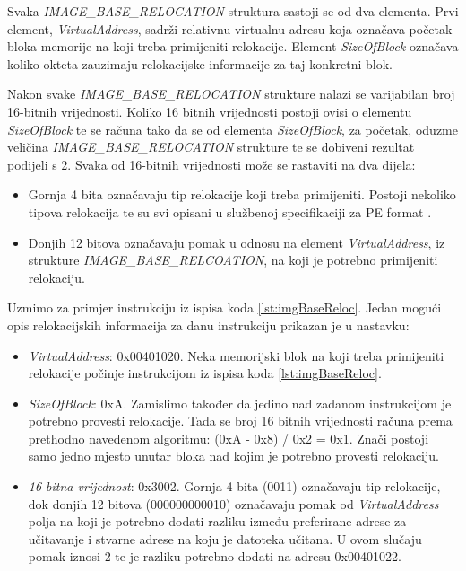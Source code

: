 \documentclass[times, utf8, diplomski, numeric]{fer}
\begin{document}
Svaka \emph{IMAGE\_BASE\_RELOCATION} struktura sastoji se od dva
elementa. Prvi element, \emph{VirtualAddress}, sadrži relativnu
virtualnu adresu koja označava početak bloka memorije na koji
treba primijeniti relokacije. Element \emph{SizeOfBlock} označava
koliko okteta zauzimaju relokacijske informacije za taj konkretni
blok. 

Nakon svake \emph{IMAGE\_BASE\_RELOCATION} strukture nalazi se
varijabilan broj 16-bitnih vrijednosti. Koliko 16 bitnih vrijednosti 
postoji ovisi o elementu \emph{SizeOfBlock} te se računa tako da
se od elementa \emph{SizeOfBlock}, za početak, oduzme veličina \emph{IMAGE\_BASE\_RELOCATION}
strukture te se dobiveni rezultat podijeli s 2. Svaka od 16-bitnih
vrijednosti može se rastaviti na dva dijela:

\begin{itemize}
\item Gornja 4 bita označavaju tip relokacije koji treba
primijeniti. Postoji nekoliko tipova relokacija te su svi opisani
u službenoj specifikaciji za PE format \citep{pe_spec}.

\item Donjih 12 bitova označavaju pomak u odnosu na element
\emph{VirtualAddress}, iz strukture
\emph{IMAGE\_BASE\_RELCOATION}, na koji je potrebno primijeniti
relokaciju.
\end{itemize}
Uzmimo za primjer instrukciju iz ispisa koda \ref{lst:imgBaseReloc}. Jedan mogući
opis relokacijskih informacija za danu instrukciju prikazan je u nastavku:
\begin{itemize}
\item \emph{VirtualAddress}: 0x00401020. Neka memorijski blok na koji treba
primijeniti relokacije počinje instrukcijom iz ispisa koda \ref{lst:imgBaseReloc}.
\item \emph{SizeOfBlock}: 0xA. Zamislimo također da jedino nad zadanom instrukcijom
je potrebno provesti relokacije. Tada se broj 16 bitnih vrijednosti računa prema 
prethodno navedenom algoritmu: (0xA - 0x8) / 0x2 = 0x1. Znači postoji samo jedno mjesto 
unutar bloka nad kojim je potrebno provesti relokaciju.
\item \emph{16 bitna vrijednost}: 0x3002. Gornja 4 bita (0011) označavaju tip relokacije,
dok donjih 12 bitova (000000000010) označavaju pomak od \emph{VirtualAddress} polja na
koji je potrebno dodati razliku između preferirane adrese za učitavanje i stvarne adrese
na koju je datoteka učitana. U ovom slučaju pomak iznosi 2 te je razliku potrebno dodati
na adresu 0x00401022.
\end{itemize}
\end{document}
